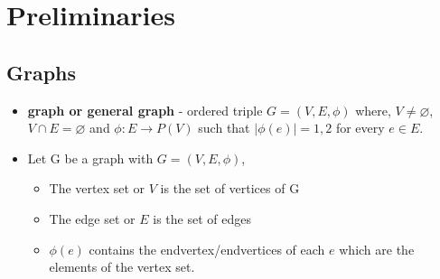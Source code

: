 \section{Preliminaries}
\subsection{Graphs}
\begin{itemize}
 \item \textbf{graph or general graph} - ordered triple $G=(V,E,\phi)$ where, $V\neq\varnothing$, $V \cap E = \varnothing$ and $\phi:E \rightarrow P(V)$ such that $|\phi(e)|={1,2}$ for every $e \in E$.
 \item Let G be a graph with $G = (V,E,\phi)$,
	\begin{itemize}
		\item The vertex set or $V$ is the set of vertices of G
		\item The edge set or $E$ is the set of edges
		\item $\phi(e)$ contains the endvertex/endvertices of each $e$ which are the elements of the vertex set. 
	\end{itemize}	 
\begin{figure}[h!]
\centering
{}
\end{figure}
\end{itemize}
